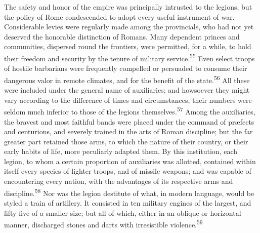 
The safety and honor of the empire was principally intrusted to
the legions, but the policy of Rome condescended to adopt every
useful instrument of war. Considerable levies were regularly made
among the provincials, who had not yet deserved the honorable
distinction of Romans. Many dependent princes and communities,
dispersed round the frontiers, were permitted, for a while, to
hold their freedom and security by the tenure of military
service.\textsuperscript{55} Even select troops of hostile barbarians were
frequently compelled or persuaded to consume their dangerous
valor in remote climates, and for the benefit of the state.\textsuperscript{56}
All these were included under the general name of auxiliaries;
and howsoever they might vary according to the difference of
times and circumstances, their numbers were seldom much inferior
to those of the legions themselves.\textsuperscript{57} Among the auxiliaries, the
bravest and most faithful bands were placed under the command of
præfects and centurions, and severely trained in the arts of
Roman discipline; but the far greater part retained those arms,
to which the nature of their country, or their early habits of
life, more peculiarly adapted them. By this institution, each
legion, to whom a certain proportion of auxiliaries was allotted,
contained within itself every species of lighter troops, and of
missile weapons; and was capable of encountering every nation,
with the advantages of its respective arms and discipline.\textsuperscript{58} Nor
was the legion destitute of what, in modern language, would be
styled a train of artillery. It consisted in ten military engines
of the largest, and fifty-five of a smaller size; but all of
which, either in an oblique or horizontal manner, discharged
stones and darts with irresistible violence.\textsuperscript{59}





